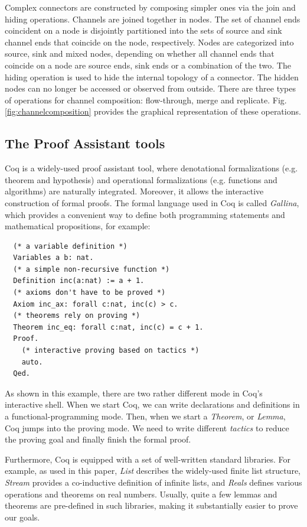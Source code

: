 \documentclass[3p,times]{elsarticle}
\begin{document}
Complex connectors are constructed by composing simpler ones via the join and hiding operations. Channels are joined together in nodes. The set of channel ends coincident on a node is disjointly partitioned into the sets of source and sink channel ends that coincide on the node, respectively. Nodes are categorized into source, sink and mixed nodes, depending on whether all channel ends that coincide on a node are source ends, sink ends or a combination of the two. The hiding operation is used to hide the internal topology of a connector. The hidden nodes can no longer be accessed or observed from outside. There are three types of operations for channel composition: flow-through, merge and replicate. Fig. \ref{fig:channelcomposition} provides the graphical representation of these operations.

\subsection{The Proof Assistant tools}

Coq\cite{huet1997coq} is a widely-used proof assistant tool, where denotational formalizations (e.g.
theorem and hypothesis) and operational formalizations (e.g. functions and algorithms) are naturally
integrated. Moreover, it allows the interactive construction of formal proofs.
The formal language used in Coq is called \emph{Gallina}, which provides a convenient way to define
both programming statements and mathematical propositions, for example:
\begin{verbatim}
  (* a variable definition *)
  Variables a b: nat.
  (* a simple non-recursive function *)
  Definition inc(a:nat) := a + 1.
  (* axioms don't have to be proved *)
  Axiom inc_ax: forall c:nat, inc(c) > c.
  (* theorems rely on proving *)
  Theorem inc_eq: forall c:nat, inc(c) = c + 1.
  Proof.
    (* interactive proving based on tactics *)
    auto.
  Qed.
\end{verbatim}

As shown in this example, there are two rather different mode in Coq's interactive shell. When
we start Coq, we can write declarations and definitions in a functional-programming mode. Then, when
we start a \emph{Theorem}, or \emph{Lemma}, Coq jumps into the proving mode. We need to write
different \emph{tactics} to reduce the proving goal and finally finish the formal proof.

Furthermore, Coq is equipped with a set of well-written standard libraries. For example, as used in
this paper, \emph{List} describes the widely-used finite list structure, \emph{Stream} provides a co-inductive
definition of infinite lists, and \emph{Reals} defines various operations and theorems on real
numbers. Usually, quite a few lemmas and theorems are pre-defined in such libraries, making it
substantially easier to prove our goals.
\end{document}
